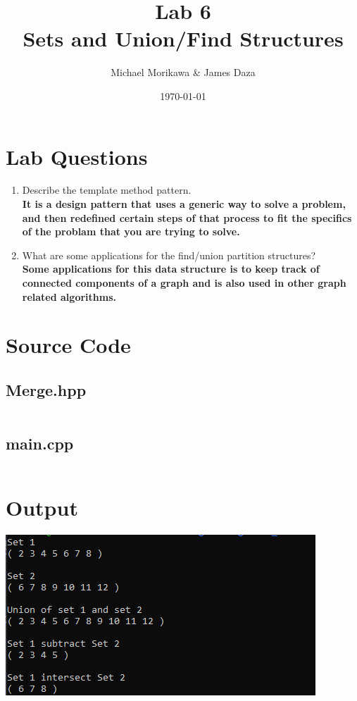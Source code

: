 \documentclass{article}
\title{Lab 6\\ Sets and Union/Find Structures}
\author{Michael Morikawa \& James Daza}
\date{\today}
\begin{document}
\maketitle
\section{Lab Questions}
\begin{enumerate}[label=\textbf{Question \arabic*}]
    \item Describe the template method pattern.\\
          \textbf{
              It is a design pattern that uses a generic way to solve a problem, and then redefined certain
              steps of that process to fit the specifics of the problam that you are trying to solve.
          }
    \item What are some applications for the find/union partition structures?\\
          \textbf{
              Some applications for this data structure is to keep track of connected components of a graph and is also used in other
              graph related algorithms.
          }


\end{enumerate}

\section{Source Code}
\subsection{Merge.hpp}
\inputminted{c++}{../include/Merge.hpp}
\subsection{main.cpp}
\inputminted{c++}{../src/main.cpp}

\section{Output}
\includegraphics[]{output.png}
\end{document}
